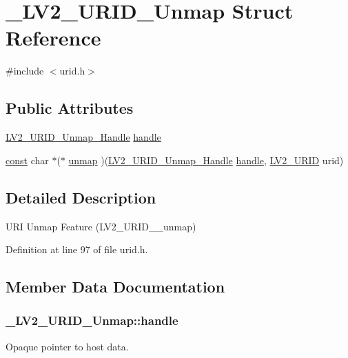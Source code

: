 \hypertarget{struct___l_v2___u_r_i_d___unmap}{}\section{\+\_\+\+L\+V2\+\_\+\+U\+R\+I\+D\+\_\+\+Unmap Struct Reference}
\label{struct___l_v2___u_r_i_d___unmap}


{\ttfamily \#include $<$urid.\+h$>$}

\subsection*{Public Attributes}
\begin{DoxyCompactItemize}
\item 
\hyperlink{urid_8h_a8af540051cff4554067642a93920866f}{L\+V2\+\_\+\+U\+R\+I\+D\+\_\+\+Unmap\+\_\+\+Handle} \hyperlink{struct___l_v2___u_r_i_d___unmap_a48a59c32b6db596964b13050f676b879}{handle}
\item 
\hyperlink{getopt1_8c_a2c212835823e3c54a8ab6d95c652660e}{const} char $\ast$($\ast$ \hyperlink{struct___l_v2___u_r_i_d___unmap_a2185877d2fa62b6356d0caa095eb5d0b}{unmap} )(\hyperlink{urid_8h_a8af540051cff4554067642a93920866f}{L\+V2\+\_\+\+U\+R\+I\+D\+\_\+\+Unmap\+\_\+\+Handle} \hyperlink{struct___l_v2___u_r_i_d___unmap_a48a59c32b6db596964b13050f676b879}{handle}, \hyperlink{urid_8h_a5ff0630d245539e9f6dca10ff3c40fae}{L\+V2\+\_\+\+U\+R\+ID} urid)
\end{DoxyCompactItemize}


\subsection{Detailed Description}
U\+RI Unmap Feature (L\+V2\+\_\+\+U\+R\+I\+D\+\_\+\+\_\+unmap) 

Definition at line 97 of file urid.\+h.



\subsection{Member Data Documentation}
\subsubsection[{\texorpdfstring{handle}{handle}}]{ \+\_\+\+L\+V2\+\_\+\+U\+R\+I\+D\+\_\+\+Unmap\+::handle}\hypertarget{struct___l_v2___u_r_i_d___unmap_a48a59c32b6db596964b13050f676b879}{}\label{struct___l_v2___u_r_i_d___unmap_a48a59c32b6db596964b13050f676b879}
Opaque pointer to host data.

